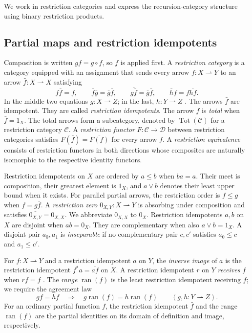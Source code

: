 \documentclass[11pt]{article}
\newcommand{\ran}{\operatorname{ran}}
\begin{document}
We work in restriction categories \cite{CockettLack} and express the
recursion-category structure using binary restriction products.

\subsection{Partial maps and restriction idempotents}

Composition is written $gf=g\circ f$, so $f$ is applied first.
A \emph{restriction category} is a category equipped with an assignment
that sends every arrow
$f:X\rightharpoonup Y$ to an arrow
$\bar f:X\rightharpoonup X$ satisfying
\[
 f\bar f=f,\qquad
 \bar f\bar g=\bar g\bar f,\qquad
 \overline{g\bar f}=\bar g\bar f,\qquad
 \bar h f=f\overline{hf}.
\]
In the middle two equations $g:X\rightharpoonup Z$; in the last,
$h:Y\rightharpoonup Z$ \cite{CockettLack}.
The arrows $\bar f$ are idempotent. They are called
\emph{restriction idempotents}.
The arrow $f$ is \emph{total} when $\bar f=1_X$.
The total arrows form a subcategory, denoted by
$\operatorname{Tot}(\mathcal C)$ for a restriction category $\mathcal C$.
A \emph{restriction functor} $F:\mathcal C\to\mathcal D$ between
restriction categories satisfies $F(\bar f)=\overline{F(f)}$ for every
arrow $f$. A \emph{restriction equivalence} consists of restriction
functors in both directions whose composites are naturally isomorphic
to the respective identity functors.

Restriction idempotents on $X$ are ordered by $a\le b$ when $ba=a$.
Their meet is composition, their greatest element is $1_X$, and
$a\vee b$ denotes their least upper bound when it exists.
For parallel partial arrows, the restriction order is
$f\le g$ when $f=g\bar f$.
A \emph{restriction zero} $0_{X,Y}:X\rightharpoonup Y$ is
absorbing under composition and satisfies
$\overline{0_{X,Y}}=0_{X,X}$. We abbreviate $0_{X,X}$ to $0_X$.
Restriction idempotents $a,b$ on $X$ are disjoint when $ab=0_X$.
They are complementary when also $a\vee b=1_X$.
A disjoint pair $a_0,a_1$ is \emph{inseparable} if no complementary
pair $c,c'$ satisfies $a_0\le c$ and $a_1\le c'$.

For $f:X\rightharpoonup Y$ and a restriction idempotent $a$ on $Y$,
the \emph{inverse image} of $a$ is the restriction idempotent
$f^*a=\overline{af}$ on $X$.
A restriction idempotent $r$ on $Y$ \emph{receives} $f$ when $rf=f$
\cite[Section 6]{Heller}.
The \emph{range} $\ran(f)$ is the least restriction idempotent receiving $f$;
we require the agreement law
\[
 gf=hf\quad\Longrightarrow\quad
 g\ran(f)=h\ran(f)
 \qquad(g,h:Y\rightharpoonup Z).
\]
For an ordinary partial function $f$, the restriction idempotent
$\bar f$ and the range $\ran(f)$ are the partial identities on its
domain of definition and image, respectively.
\end{document}
